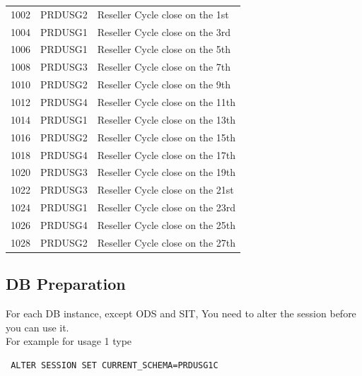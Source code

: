 \documentclass[12pt,twoside]{article}
\begin{document}
\begin{center}
\begin{tabular}{rll}
               1002  &  PRDUSG2            &  Reseller Cycle close on the 1st                  \\
               1004  &  PRDUSG1            &  Reseller Cycle close on the 3rd                  \\
               1006  &  PRDUSG1            &  Reseller Cycle close on the 5th                  \\
               1008  &  PRDUSG3            &  Reseller Cycle close on the 7th                  \\
               1010  &  PRDUSG2            &  Reseller Cycle close on the 9th                  \\
               1012  &  PRDUSG4            &  Reseller Cycle close on the 11th                 \\
               1014  &  PRDUSG1            &  Reseller Cycle close on the 13th                 \\
               1016  &  PRDUSG2            &  Reseller Cycle close on the 15th                 \\
               1018  &  PRDUSG4            &  Reseller Cycle close on the 17th                 \\
               1020  &  PRDUSG3            &  Reseller Cycle close on the 19th                 \\
               1022  &  PRDUSG3            &  Reseller Cycle close on the 21st                 \\
               1024  &  PRDUSG1            &  Reseller Cycle close on the 23rd                 \\
               1026  &  PRDUSG4            &  Reseller Cycle close on the 25th                 \\
               1028  &  PRDUSG2            &  Reseller Cycle close on the 27th                 \\
\hline
\end{tabular}
\end{center}



\normalsize
\subsection{DB Preparation}
\label{sec-8-2}

   For each DB instance, except ODS and SIT, You need to alter the session before you can use it.\\ For example  for usage 1 type
\begin{verbatim}
 ALTER SESSION SET CURRENT_SCHEMA=PRDUSG1C
\end{verbatim}
\end{document}
